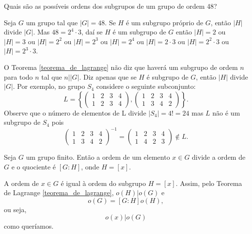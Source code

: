 \begin{exemplo}
    Quais são as possíveis ordens dos subgrupos de um grupo de ordem 48?
    \begin{solucao}
        Seja $G$ um grupo tal que $|G|=48$. Se $H$ é um subgrupo próprio de $G$, então $|H|$ divide $|G|$. Mas $48=2^{4}\cdot 3$, daí se $H$ é um subgrupo de $G$ então $|H|=2$ ou $|H|=3$ ou $|H|= 2^{2}$ ou $|H|=2^{3}$ ou $|H|=2^{4}$ ou $|H|=2\cdot3$ ou $|H|=2^2\cdot 3$ ou $|H|=2^3\cdot 3$.
    \end{solucao}
\end{exemplo}

\begin{observacao}
    O Teorema \ref{teorema_de_lagrange} não diz que haverá um subgrupo de ordem $n$ para todo $n$ tal que $n||G|$. Diz apenas que se $H$ é subgrupo de $G$, então $|H|$ divide $|G|$. Por exemplo, no grupo $S_4$ considere o seguinte subconjunto:
            \[
                L = \left\{\begin{pmatrix}
                    1 & 2 & 3 & 4\\
                    1 & 2 & 3 & 4
                \end{pmatrix}, \begin{pmatrix}
                    1 & 2 & 3 & 4\\
                    1 & 3 & 4 & 2
                \end{pmatrix}\right\}.
            \]
            Observe que o número de elementos de L divide $|S_4| = 4! = 24$ mas $L$ não é um subgrupo de $S_4$ pois
            \[
                \begin{pmatrix}
                    1 & 2 & 3 & 4\\
                    1 & 3 & 4 & 2
                \end{pmatrix}^{-1} = \begin{pmatrix}
                    1 & 2 & 3 & 4\\
                    1 & 4 & 2 & 3
                \end{pmatrix} \notin L.
            \]
\end{observacao}

\begin{corolario}\label{primeiro_coralario_Lagrange}
    Seja $G$ um grupo finito. Então a ordem de um elemento $x \in G$ divide a ordem de $G$ e o quociente é $[G : H]$, onde $H = [x]$.
\end{corolario}
\begin{prova}
    A ordem de $x \in G$ é igual à ordem do subgrupo $H = [x]$. Assim, pelo Teorema de Lagrange \eqref{teorema_de_lagrange}, $o(H) | o(G)$ e
    \[
        o(G) = [G : H]o(H),
    \]
    ou seja,
    \[
        o(x) | o(G)
    \]
    como queríamos.
\end{prova}

